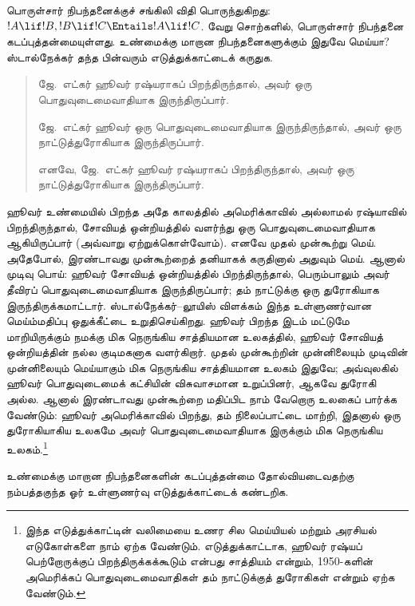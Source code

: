 \documentclass[../../../include/open-logic-section]{subfiles}
\begin{document}


பொருள்சார் நிபந்தனைக்குச் சங்கிலி விதி பொருந்துகிறது: $!A \lif !B,
!B \lif !C \Entails !A \lif !C$. வேறு சொற்களில், பொருள்சார் நிபந்தனை
கடப்புத்தன்மையுள்ளது. உண்மைக்கு மாறான நிபந்தனைகளுக்கும் இதுவே மெய்யா?
ஸ்டால்நேக்கர் தந்த பின்வரும் எடுத்துக்காட்டைக் கருதுக.
\begin{quote}
  ஜே.~எட்கர் ஹூவர் ரஷ்யராகப் பிறந்திருந்தால், அவர் ஒரு பொதுவுடைமைவாதியாக
  இருந்திருப்பார்.

  ஜே.~எட்கர் ஹூவர் ஒரு பொதுவுடைமைவாதியாக இருந்திருந்தால், அவர் ஒரு
  நாட்டுத்துரோகியாக இருந்திருப்பார்.

  எனவே, ஜே.~எட்கர் ஹூவர் ரஷ்யராகப் பிறந்திருந்தால், அவர் ஒரு
  நாட்டுத்துரோகியாக இருந்திருப்பார்.
\end{quote}
ஹூவர் உண்மையில் பிறந்த அதே காலத்தில் அமெரிக்காவில் அல்லாமல் ரஷ்யாவில்
பிறந்திருந்தால், சோவியத் ஒன்றியத்தில் வளர்ந்து ஒரு பொதுவுடைமைவாதியாக
ஆகியிருப்பார் (அவ்வாறு ஏற்றுக்கொள்வோம்). எனவே முதல் முன்கூற்று மெய்.
அதேபோல், இரண்டாவது முன்கூற்றைத் தனியாகக் கருதினால் அதுவும் மெய். ஆனால்
முடிவு பொய்: ஹூவர் சோவியத் ஒன்றியத்தில் பிறந்திருந்தால், பெரும்பாலும்
அவர் தீவிரப் பொதுவுடைமைவாதியாக இருந்திருப்பார்; தம் நாட்டுக்கு ஒரு
துரோகியாக இருந்திருக்கமாட்டார். ஸ்டால்நேக்கர்--லூயிஸ் விளக்கம் இந்த
உள்ளுணர்வான மெய்ம்மதிப்பு ஒதுக்கீட்டை உறுதிசெய்கிறது. ஹூவர் பிறந்த இடம்
மட்டுமே மாறியிருக்கும் நமக்கு மிக நெருங்கிய சாத்தியமான உலகத்தில், ஹூவர்
சோவியத் ஒன்றியத்தின் நல்ல குடிமகனாக வளர்கிறார். முதல் முன்கூற்றின்
முன்னிலையும் முடிவின் முன்னிலையும் மெய்யாகும் மிக நெருங்கிய சாத்தியமான
உலகம் இதுவே; அவ்வுலகில் ஹூவர் பொதுவுடைமைக் கட்சியின் விசுவாசமான உறுப்பினர்,
ஆகவே துரோகி அல்ல. ஆனால் இரண்டாவது முன்கூற்றை மதிப்பிட நாம் வேறொரு உலகைப்
பார்க்க வேண்டும்: ஹூவர் அமெரிக்காவில் பிறந்து, தம் நிலைப்பாட்டை மாற்றி,
இதனால் ஒரு துரோகியாகிய உலகமே அவர் பொதுவுடைமைவாதியாக இருக்கும் மிக நெருங்கிய
உலகம்.\footnote{இந்த எடுத்துக்காட்டின் வலிமையை உணர சில மெய்யியல் மற்றும்
  அரசியல் எடுகோள்களை நாம் ஏற்க வேண்டும். எடுத்துக்காட்டாக, ஹூவர் ரஷ்யப்
  பெற்றோருக்குப் பிறந்திருக்கக்கூடும் என்பது சாத்தியம் என்றும், 1950-களின்
  அமெரிக்கப் பொதுவுடைமைவாதிகள் தம் நாட்டுக்குத் துரோகிகள் என்றும் ஏற்க
  வேண்டும்.}

\begin{prob}
  உண்மைக்கு மாறான நிபந்தனைகளின் கடப்புத்தன்மை தோல்வியடைவதற்கு
  நம்பத்தகுந்த ஓர் உள்ளுணர்வு எடுத்துக்காட்டைக் கண்டறிக.
\end{prob}
\end{document}

